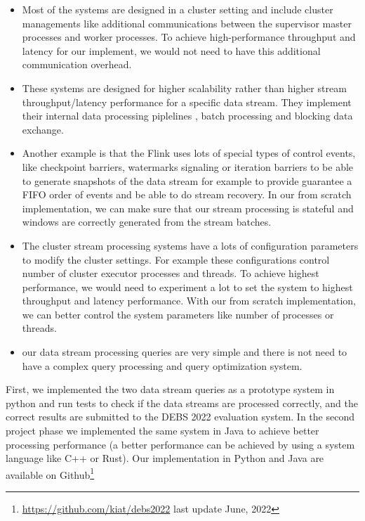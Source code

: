 \begin{itemize}
    \item Most of the systems are designed in a cluster setting and include cluster managements like additional communications between the supervisor master processes and worker processes.
    To achieve high-performance throughput and latency for our implement, we would not need to have this additional communication overhead.   
    \item These systems are designed for higher scalability rather than higher stream throughput/latency performance for a specific data stream. They  implement their internal data processing piplelines 
    , batch processing and blocking data exchange. 

    \item Another example is that the Flink uses lots of special types of control events, like  checkpoint barriers,  watermarks signaling or iteration barriers to be able to generate snapshots of 
    the data stream for example to provide guarantee a FIFO order of events and be able to do stream recovery. In our from scratch implementation, we can make sure that our stream processing 
    is stateful and windows are correctly generated from the stream batches.
    
    \item The cluster stream processing systems have a lots of configuration parameters to modify the cluster settings. For example these configurations control number of cluster executor processes and threads. To achieve highest performance, we would need 
    to experiment a lot to set the system to highest throughput and latency performance. With our from scratch implementation, we can better control the system parameters like number of processes or threads. 

    \item our data stream processing queries are very simple and there is not need to have a complex query processing and query optimization system. 

\end{itemize}



First, we implemented the two data stream queries as a prototype system in python and run tests to check if the data streams are processed correctly, and the correct
results are submitted to the DEBS 2022 evaluation system. In the second project phase we implemented the same system in Java to achieve better processing 
performance (a better performance can be achieved by using a system language like C++ or Rust).  
Our implementation in Python and Java are available on Github\footnote{\url{https://github.com/kiat/debs2022} last update June, 2022}


